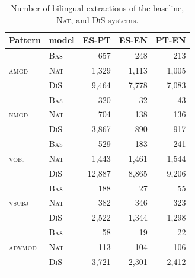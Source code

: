 \documentclass[output=paper
,modfonts
,nonflat]{langsci/langscibook}
\begin{document}
\begin{table}
  \begin{center}
    \caption{\label{tab:extract} Number of bilingual extractions of the baseline,
      \textsc{Nat}, and \textsc{DiS} systems.}
    \begin{tabular}{llrrr}
      \lsptoprule
      \textbf{Pattern} & \textbf{model} & \textbf{ES-PT} & \textbf{ES-EN} & \textbf{PT-EN}\\
      \midrule
	\multirow{3}{*}{\textsc{amod}} & \textsc{Bas} & 657 & 248 & 213\\ 
	& \textsc{Nat} & 1,329 & 1,113 & 1,005\\ 
	& \textsc{DiS} & 9,464 & 7,778 & 7,083\\ \midrule
	\multirow{3}{*}{\textsc{nmod}} & \textsc{Bas} & 320 & 32 & 43\\ 
	& \textsc{Nat} & 704 & 138 & 136\\ 
	& \textsc{DiS} & 3,867 & 890 & 917\\ \midrule
	\multirow{3}{*}{\textsc{vobj}} & \textsc{Bas} & 529 & 183 & 241\\ 
	& \textsc{Nat} & 1,443 & 1,461 & 1,544\\ 
	& \textsc{DiS} & 12,887 & 8,865 & 9,206\\ \midrule
	\multirow{3}{*}{\textsc{vsubj}} & \textsc{Bas} & 188 & 27 & 55\\ 
	& \textsc{Nat} & 382 & 346 & 323\\ 
	& \textsc{DiS} & 2,522 & 1,344 & 1,298\\ \midrule
	\multirow{3}{*}{\textsc{advmod}} & \textsc{Bas} & 58 & 19 & 22\\ 
	& \textsc{Nat} & 113 & 104 & 106\\ 
	& \textsc{DiS} & 3,721 & 2,301 & 2,412\\
      \lspbottomrule
    \end{tabular}
  \end{center}
\end{table}
\end{document}
